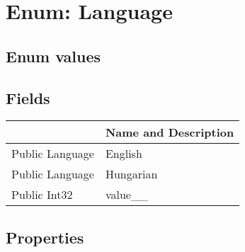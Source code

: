 \documentclass[11pt, oneside, a4paper]{book}
\begin{document}
\hypertarget{SoftwareEngineeringTools.{}Documentation.{}Language}{}
\section{Enum: Language}

\subsection{Enum values}

\subsection{Fields}
\begin{center}
\begin{tabular}{| p{3cm} | p{12cm} | }
\hline
\textbf{ } & \textbf{ Name and Description}\\
\hline
 Public  Language &  English\hypertarget{SoftwareEngineeringTools.{}Documentation.{}Language.{}English}{}\\
\hline
 Public  Language &  Hungarian\hypertarget{SoftwareEngineeringTools.{}Documentation.{}Language.{}Hungarian}{}\\
\hline
 Public  Int32 &  value\_\_\hypertarget{SoftwareEngineeringTools.{}Documentation.{}Language.{}value\_\_}{}\\
\hline
\end{tabular}
\end{center}

\subsection{Properties}
\end{document}
